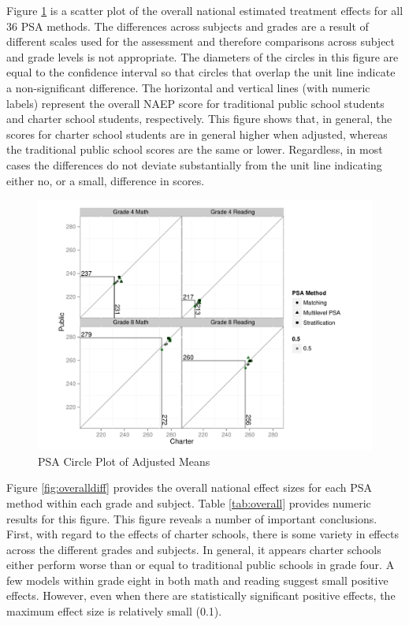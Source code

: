 \documentclass[letterpaper,12p,twoside]{article} %
\begin{document}
Figure \ref{fig:overallcirc} is a scatter plot of the overall national estimated treatment effects for all 36 PSA methods. The differences across subjects and grades are a result of different scales used for the assessment and therefore comparisons across subject and grade levels is not appropriate. The diameters of the circles in this figure are equal to the confidence interval so that circles that overlap the unit line indicate a non-significant difference. The horizontal and vertical lines (with numeric labels) represent the overall NAEP score for traditional public school students and charter school students, respectively. This figure shows that, in general, the scores for charter school students are in general higher when adjusted, whereas the traditional public school scores are the same or lower. Regardless, in most cases the differences do not deviate substantially from the unit line indicating either no, or a small, difference in scores. 

\begin{figure}[t]
\begin{center}
\includegraphics[width=\textwidth]{../Figures2009/OverallScatter.pdf}
\caption{PSA Circle Plot of Adjusted Means}
\label{fig:overallcirc}
\end{center}
\end{figure}

Figure \ref{fig:overalldiff} provides the overall national effect sizes for each PSA method within each grade and subject. Table \ref{tab:overall} provides numeric results for this figure. This figure reveals a number of important conclusions. First, with regard to the effects of charter schools, there is some variety in effects across the different grades and subjects. In general, it appears charter schools either perform worse than or equal to traditional public schools in grade four. A few models within grade eight in both math and reading suggest small positive effects. However, even when there are statistically significant positive effects, the maximum effect size is relatively small (0.1). 
\end{document}
